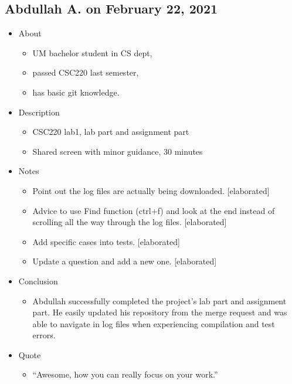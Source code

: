 \subsection{Abdullah A. on February 22, 2021}\label{ssec:abdullah0222}

\begin{itemize}
\item
  {About}
  \begin{itemize}
  \item
    {UM bachelor student in CS dept,}
  \item
    {passed CSC220 last semester,}
  \item
    {has basic git knowledge.}
  \end{itemize}

\item
  {Description}
  \begin{itemize}
  \item
    {CSC220 lab1, lab part and assignment part}
  \item
    {Shared screen with minor guidance, 30 minutes}
  \end{itemize}

\item
  {Notes}
  \begin{itemize}
  \item
    {Point out the log files are actually being downloaded. {[}elaborated{]}}
  \item
    {Advice to use Find function (ctrl+f) and look at the end instead of scrolling all the way through the log files. {[}elaborated{]}}
  \item
    {Add specific cases into tests. {[}elaborated{]}}
  \item
    {Update a question and add a new one. {[}elaborated{]}}
  \end{itemize}

\item
  {Conclusion}
  \begin{itemize}
  \item
    {Abdullah successfully completed the project's lab part and assignment part. He easily updated his repository from the merge request and was able to navigate in log files when experiencing compilation and test errors.}
  \end{itemize}

\item
  {Quote}
  \begin{itemize}
  \item
    {``Awesome, how you can really focus on your work.''}
  \end{itemize}
\end{itemize}

